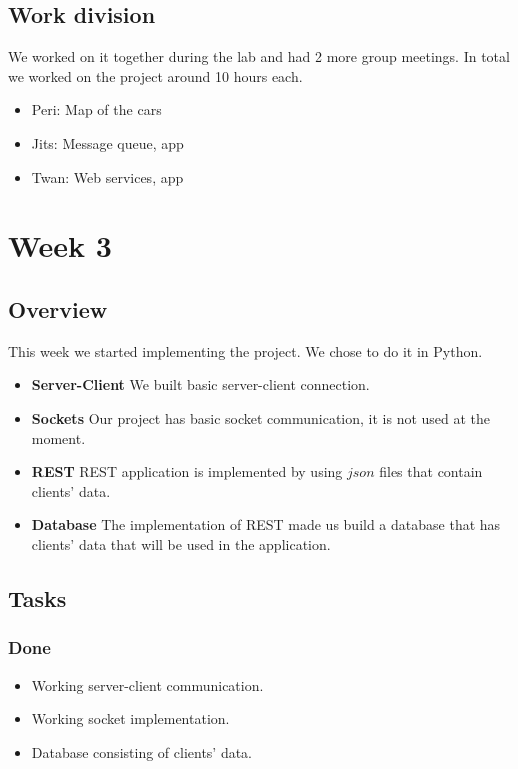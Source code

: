 \documentclass[a4paper]{article}
\begin{document}
\subsection*{Work division}
We worked on it together during the lab and had 2 more group meetings. In total we worked on the project around 10 hours each. 
\begin{itemize}
    \item Peri: Map of the cars
    \item Jits: Message queue, app
    \item Twan: Web services, app
\end{itemize}

\section*{Week 3}
\subsection*{Overview}
This week we started implementing the project. We chose to do it in Python. 
\begin{itemize}
    \item \textbf{Server-Client} We built basic server-client connection.
	\item \textbf{Sockets} Our project has basic socket communication, it is not used at the moment.
	\item \textbf{REST} REST application is implemented by using $json$ files that contain clients' data.
	\item \textbf{Database} The implementation of REST made us build a database that has clients' data that will be used in the application.
\end{itemize}

\subsection*{Tasks}
\subsubsection*{Done}
\begin{itemize}
    \item Working server-client communication.
    \item Working socket implementation.
    \item Database consisting of clients' data.
\end{itemize}
\end{document}
